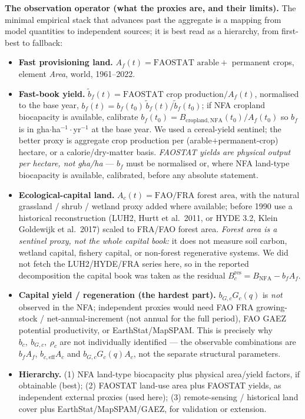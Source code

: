 \documentclass[11pt]{article}
\begin{document}
\noindent\textbf{The observation operator (what the proxies are, and their limits).} The minimal empirical stack
that advances past the aggregate is a mapping from model quantities to independent sources; it is best read as a
hierarchy, from first-best to fallback:

\begin{itemize}
\item \textbf{Fast provisioning land.} $A_f(t)=\text{FAOSTAT arable}+$ permanent crops, element \emph{Area},
world, 1961--2022.
\item \textbf{Fast-book yield.} $\tilde b_f(t)=\text{FAOSTAT crop production}/A_f(t)$, normalised to the base year,
$b_f(t)=b_f(t_0)\,\tilde b_f(t)/\tilde b_f(t_0)$; if NFA cropland biocapacity is available, calibrate
$b_f(t_0)=B_{\mathrm{cropland,NFA}}(t_0)/A_f(t_0)$ so $b_f$ is in gha$\cdot$ha$^{-1}\cdot$yr$^{-1}$ at the base
year. We used a cereal-yield sentinel; the better proxy is aggregate crop production per (arable$+$permanent-crop)
hectare, or a calorie/dry-matter basis. \emph{FAOSTAT yields are physical output per hectare, not gha/ha} ---
$b_f$ must be normalised or, where NFA land-type biocapacity is available, calibrated, before any absolute
statement.
\item \textbf{Ecological-capital land.} $A_c(t)=\text{FAO/FRA forest area}$, with the natural grassland / shrub /
wetland proxy added where available; before 1990 use a historical reconstruction (LUH2, Hurtt et al.\ 2011, or
HYDE 3.2, Klein Goldewijk et al.\ 2017) scaled to FRA/FAO forest area. \emph{Forest area is a sentinel proxy, not
the whole capital book:} it does not measure soil carbon, wetland capital, fishery capital, or non-forest
regenerative systems. We did not fetch the LUH2/HYDE/FRA series here, so in the reported decomposition the capital
book was taken as the residual $B_c^{\mathrm{res}}=B_{\mathrm{NFA}}-b_fA_f$.
\item \textbf{Capital yield / regeneration (the hardest part).} $b_{G,c}G_c(q)$ is \emph{not} observed in the
NFA; independent proxies would need FAO FRA growing-stock / net-annual-increment (not annual for the full period),
FAO GAEZ potential productivity, or EarthStat/MapSPAM. This is precisely why $b_c,\ b_{G,c},\ \rho_c$ are not
individually identified --- the observable combinations are $b_fA_f$, $b_{c,\mathrm{eff}}A_c$ and $b_{G,c}G_c(q)A_c$,
not the separate structural parameters.
\item \textbf{Hierarchy.} (1) NFA land-type biocapacity plus physical area/yield factors, if obtainable (best);
(2) FAOSTAT land-use area plus FAOSTAT yields, as independent external proxies (used here); (3) remote-sensing /
historical land cover plus EarthStat/MapSPAM/GAEZ, for validation or extension.
\end{itemize}
\end{document}
